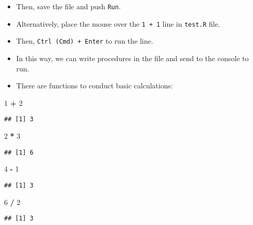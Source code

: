 \documentclass[
]{book}
\newenvironment{Shaded}{\begin{snugshade}}{\end{snugshade}}
\newcommand{\DecValTok}[1]{\textcolor[rgb]{0.00,0.00,0.81}{#1}}
\newcommand{\OperatorTok}[1]{\textcolor[rgb]{0.81,0.36,0.00}{\textbf{#1}}}
\newcommand{\StringTok}[1]{\textcolor[rgb]{0.31,0.60,0.02}{#1}}
\begin{document}
\begin{itemize}
\item
  Then, save the file and push \texttt{Run}.
\item
  Alternatively, place the mouse over the \texttt{1\ +\ 1} line in \texttt{test.R} file.
\item
  Then, \texttt{Ctrl\ (Cmd)\ +\ Enter} to run the line.
\item
  In this way, we can write procedures in the file and send to the console to run.
\item
  There are functions to conduct basic calculations:
\end{itemize}

\begin{Shaded}
\begin{Highlighting}[]
\DecValTok{1} \OperatorTok{+}\StringTok{ }\DecValTok{2}
\end{Highlighting}
\end{Shaded}

\begin{verbatim}
## [1] 3
\end{verbatim}

\begin{Shaded}
\begin{Highlighting}[]
\DecValTok{2} \OperatorTok{*}\StringTok{ }\DecValTok{3}
\end{Highlighting}
\end{Shaded}

\begin{verbatim}
## [1] 6
\end{verbatim}

\begin{Shaded}
\begin{Highlighting}[]
\DecValTok{4} \OperatorTok{-}\StringTok{ }\DecValTok{1}
\end{Highlighting}
\end{Shaded}

\begin{verbatim}
## [1] 3
\end{verbatim}

\begin{Shaded}
\begin{Highlighting}[]
\DecValTok{6} \OperatorTok{/}\StringTok{ }\DecValTok{2}
\end{Highlighting}
\end{Shaded}

\begin{verbatim}
## [1] 3
\end{verbatim}
\end{document}
